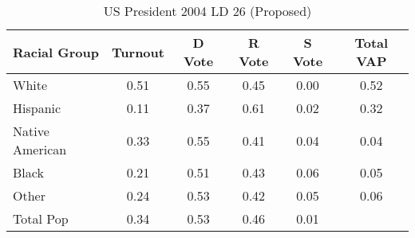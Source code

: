 \begin{table}[htb]
\begin{center}
\caption{US President 2004 LD 26 (Proposed)}
\label{pres04_vap_ld_26}
\begin{tabular}{lccccc}
  \hline
Racial Group & Turnout & D Vote & R Vote & S Vote & Total VAP \\ 
  \hline
White & 0.51 & 0.55 & 0.45 & 0.00 & 0.52 \\ 
  Hispanic & 0.11 & 0.37 & 0.61 & 0.02 & 0.32 \\ 
  Native American & 0.33 & 0.55 & 0.41 & 0.04 & 0.04 \\ 
  Black & 0.21 & 0.51 & 0.43 & 0.06 & 0.05 \\ 
  Other & 0.24 & 0.53 & 0.42 & 0.05 & 0.06 \\ 
  Total Pop & 0.34 & 0.53 & 0.46 & 0.01 &  \\ 
   \hline
\end{tabular}
\end{center}
\end{table}
